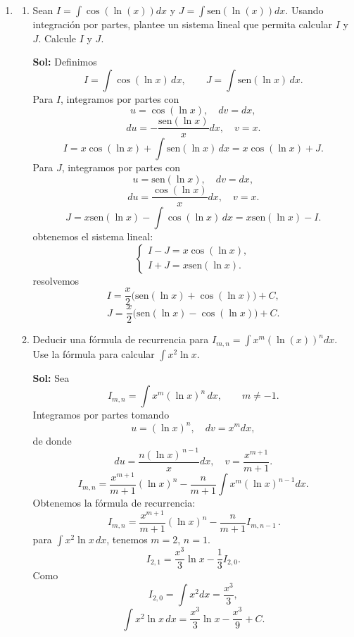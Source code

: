 \documentclass[letterpaper,12pt]{article}
\theoremstyle{plain}
\theoremstyle{definition}
\newcommand{\sen}{\text{sen}}
\begin{document}
\begin{enumerate}
\begin{enumerate}
        \item Encuentre el volumen del sólido de revolución que se obtiene al rotar la región $R$ en torno al eje $OX$.

\color{blue}
\textbf{Sol:} Al rotar $R$ alrededor del eje $OX$ usamos
\[
V=\pi\int_{0}^{1} \bigl(f(x)\bigr)^2\,dx.
\]
con $f(x)=x\sqrt{1-x^2}$,
\[
\bigl(f(x)\bigr)^2=x^2(1-x^2).
\]
\[
V=\pi\int_{0}^{1}\left(x^2-x^4\right)dx.
\]
\[
V=\pi\left[\frac{x^3}{3}-\frac{x^5}{5}\right]_{0}^{1}.
\]
\[
V=\pi\left(\frac{1}{3}-\frac{1}{5}\right)=\frac{2\pi}{15}.
\]

\color{black}
          
    \end{enumerate}
    \item 
\begin{enumerate}
\item Sean $\displaystyle I = \int \cos(\ln(x))dx$ y $\displaystyle J = \int \sen(\ln(x))dx$. Usando integración por partes, plantee un sistema lineal que permita calcular $I$ y $J$. Calcule $I$ y $J$.

\color{blue}
\textbf{Sol:} Definimos
\[
I=\int \cos(\ln x)\,dx, \qquad J=\int \sen(\ln x)\,dx.
\]
Para $I$, integramos por partes con
\[
u=\cos(\ln x), \quad dv=dx,
\]
\[
du=-\frac{\sen(\ln x)}{x}dx, \quad v=x.
\]
\[
I=x\cos(\ln x)+\int \sen(\ln x)\,dx=x\cos(\ln x)+J.
\]
Para $J$, integramos por partes con
\[
u=\sen(\ln x), \quad dv=dx,
\]
\[
du=\frac{\cos(\ln x)}{x}dx, \quad v=x.
\]
\[
J=x\sen(\ln x)-\int \cos(\ln x)\,dx=x\sen(\ln x)-I.
\]
obtenemos el sistema lineal:
\[
\begin{cases}
I - J = x\cos(\ln x),\\
I + J = x\sen(\ln x).
\end{cases}
\]
resolvemos
\[
I=\frac{x}{2}\big(\sen(\ln x)+\cos(\ln x)\big)+C,
\]
\[
J=\frac{x}{2}\big(\sen(\ln x)-\cos(\ln x)\big)+C.
\]
\color{black}

\item Deducir una fórmula de recurrencia para $\displaystyle I_{m,n} = \int x^m (\ln(x))^n dx$. Use la fórmula para calcular $\displaystyle \int x^2 \ln x$.

\color{blue}
\textbf{Sol:} Sea
\[
I_{m,n}=\int x^m(\ln x)^n\,dx,\qquad m\neq -1.
\]
Integramos por partes tomando
\[
u=(\ln x)^n,\quad dv=x^m dx,
\]
de donde
\[
du=\frac{n(\ln x)^{\,n-1}}{x}dx,\quad v=\frac{x^{m+1}}{m+1}.
\]
\[
I_{m,n}=\frac{x^{m+1}}{m+1}(\ln x)^n-\frac{n}{m+1}\int x^m(\ln x)^{n-1}dx.
\]
Obtenemos la fórmula de recurrencia:
\[
\,I_{m,n}=\frac{x^{m+1}}{m+1}(\ln x)^n-\frac{n}{m+1}I_{m,n-1}\, .
\]
para $\displaystyle \int x^2\ln x\,dx$, tenemos $m=2$, $n=1$.
\[
I_{2,1}=\frac{x^3}{3}\ln x-\frac{1}{3}I_{2,0}.
\]
Como
\[
I_{2,0}=\int x^2dx=\frac{x^3}{3},
\]
\[
\int x^2\ln x\,dx=\frac{x^3}{3}\ln x-\frac{x^3}{9}+C.
\]
\color{black}


\end{enumerate}
\end{enumerate}
\end{document}
